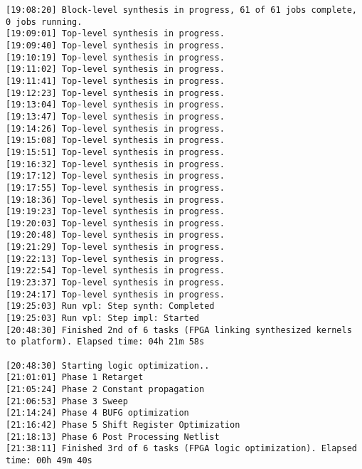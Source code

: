 \begin{lstlisting}[label=some-code-2,caption=Содержимое файла v++\_vinc.log]
[19:08:20] Block-level synthesis in progress, 61 of 61 jobs complete, 0 jobs running.
[19:09:01] Top-level synthesis in progress.
[19:09:40] Top-level synthesis in progress.
[19:10:19] Top-level synthesis in progress.
[19:11:02] Top-level synthesis in progress.
[19:11:41] Top-level synthesis in progress.
[19:12:23] Top-level synthesis in progress.
[19:13:04] Top-level synthesis in progress.
[19:13:47] Top-level synthesis in progress.
[19:14:26] Top-level synthesis in progress.
[19:15:08] Top-level synthesis in progress.
[19:15:51] Top-level synthesis in progress.
[19:16:32] Top-level synthesis in progress.
[19:17:12] Top-level synthesis in progress.
[19:17:55] Top-level synthesis in progress.
[19:18:36] Top-level synthesis in progress.
[19:19:23] Top-level synthesis in progress.
[19:20:03] Top-level synthesis in progress.
[19:20:48] Top-level synthesis in progress.
[19:21:29] Top-level synthesis in progress.
[19:22:13] Top-level synthesis in progress.
[19:22:54] Top-level synthesis in progress.
[19:23:37] Top-level synthesis in progress.
[19:24:17] Top-level synthesis in progress.
[19:25:03] Run vpl: Step synth: Completed
[19:25:03] Run vpl: Step impl: Started
[20:48:30] Finished 2nd of 6 tasks (FPGA linking synthesized kernels to platform). Elapsed time: 04h 21m 58s 

[20:48:30] Starting logic optimization..
[21:01:01] Phase 1 Retarget
[21:05:24] Phase 2 Constant propagation
[21:06:53] Phase 3 Sweep
[21:14:24] Phase 4 BUFG optimization
[21:16:42] Phase 5 Shift Register Optimization
[21:18:13] Phase 6 Post Processing Netlist
[21:38:11] Finished 3rd of 6 tasks (FPGA logic optimization). Elapsed time: 00h 49m 40s 


\end{lstlisting}
